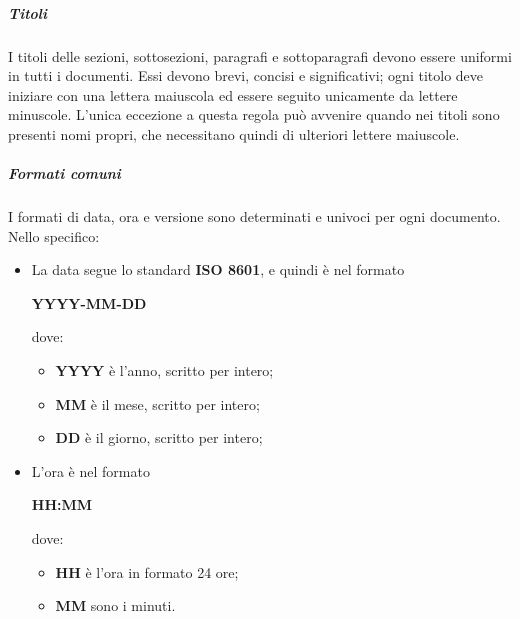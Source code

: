 \documentclass[../norme-di-progetto.tex]{subfiles}
\begin{document}
\subparagraph*{Titoli}
I titoli delle sezioni, sottosezioni, paragrafi e sottoparagrafi devono essere uniformi in tutti i documenti. Essi devono brevi, concisi e significativi; ogni titolo deve iniziare con una lettera maiuscola ed essere seguito unicamente da lettere minuscole. L'unica eccezione a questa regola può avvenire quando nei titoli sono presenti nomi propri, che necessitano quindi di ulteriori lettere maiuscole.

\subparagraph*{Formati comuni}
I formati di data, ora e versione sono determinati e univoci per ogni documento. Nello specifico:
\begin{itemize}
  \item La data segue lo standard \textbf{ISO 8601}, e quindi è nel formato \\ \begin{center}
    \centering
    \textbf{YYYY-MM-DD}
  \end{center} dove:
  \begin{itemize}
    \item \textbf{YYYY} è l'anno, scritto per intero;
    \item \textbf{MM} è il mese, scritto per intero;
    \item \textbf{DD} è il giorno, scritto per intero;
  \end{itemize}
  \item L'ora è nel formato \\ \begin{center}
  \centering
  \textbf{HH:MM}
  \end{center} dove:
  \begin{itemize}
    \item \textbf{HH} è l'ora in formato 24 ore;
    \item \textbf{MM} sono i minuti.
  \end{itemize}
\end{itemize}
\end{document}
